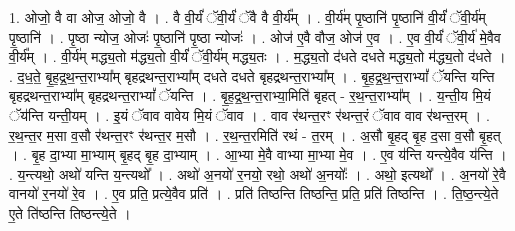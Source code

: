 \documentclass[17pt]{extarticle}
\begin{document}
1. ओजो॒ वै वा ओज॒ ओजो॒ वै । . वै वी॒र्यं॑ ॅवी॒र्यं॑ ॅवै वै वी॒र्य᳚म् । . वी॒र्य॑म् पृ॒ष्ठानि॑ पृ॒ष्ठानि॑ वी॒र्यं॑ ॅवी॒र्य॑म् पृ॒ष्ठानि॑ । . पृ॒ष्ठा न्योज॒ ओजः॑ पृ॒ष्ठानि॑ पृ॒ष्ठा न्योजः॑ । . ओज॑ ए॒वै वौज॒ ओज॑ ए॒व । . ए॒व वी॒र्यं॑ ॅवी॒र्य॑ मे॒वैव वी॒र्य᳚म् । . वी॒र्य॑म् मद्ध्य॒तो म॑द्ध्य॒तो वी॒र्यं॑ ॅवी॒र्य॑म् मद्ध्य॒तः । . म॒द्ध्य॒तो द॑धते दधते मद्ध्य॒तो म॑द्ध्य॒तो द॑धते । . द॒ध॒ते॒ बृ॒ह॒द्र॒थ॒न्त॒राभ्या᳚म् बृहद्रथन्त॒राभ्या᳚म् दधते दधते बृहद्रथन्त॒राभ्या᳚म् । . बृ॒ह॒द्र॒थ॒न्त॒राभ्यां᳚ ॅयन्ति यन्ति बृहद्रथन्त॒राभ्या᳚म् बृहद्रथन्त॒राभ्यां᳚ ॅयन्ति । . बृ॒ह॒द्र॒थ॒न्त॒राभ्या॒मिति॑ बृहत् - र॒थ॒न्त॒राभ्या᳚म् । . य॒न्ती॒य मि॒यं ॅय॑न्ति यन्ती॒यम् । . इ॒यं ॅवाव वावेय मि॒यं ॅवाव । . वाव र॑थन्त॒रꣳ र॑थन्त॒रं ॅवाव वाव र॑थन्त॒रम् । . र॒थ॒न्त॒र म॒सा व॒सौ र॑थन्त॒रꣳ र॑थन्त॒र म॒सौ । . र॒थ॒न्त॒रमिति॑ रथं - त॒रम् । . अ॒सौ बृ॒हद् बृ॒ह द॒सा व॒सौ बृ॒हत् । . बृ॒ह दा॒भ्या मा॒भ्याम् बृ॒हद् बृ॒ह दा॒भ्याम् । . आ॒भ्या मे॒वै वाभ्या मा॒भ्या मे॒व । . ए॒व य॑न्ति यन्त्ये॒वैव य॑न्ति । . य॒न्त्यथो॒ अथो॑ यन्ति य॒न्त्यथो᳚ । . अथो॑ अ॒नयो॑ र॒नयो॒ रथो॒ अथो॑ अ॒नयोः᳚ । . अथो॒ इत्यथो᳚ । . अ॒नयो॑ रे॒वै वानयो॑ र॒नयो॑ रे॒व । . ए॒व प्रति॒ प्रत्ये॒वैव प्रति॑ । . प्रति॑ तिष्ठन्ति तिष्ठन्ति॒ प्रति॒ प्रति॑ तिष्ठन्ति । . ति॒ष्ठ॒न्त्ये॒ते ए॒ते ति॑ष्ठन्ति तिष्ठन्त्ये॒ते । \newline
\end{document}
